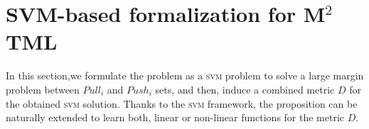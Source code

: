 \section{SVM-based formalization for M$^2$TML}
\label{sec:svm_based}
In this section,we formulate the problem as a \textsc{svm} problem to solve a large margin problem between $Pull_i$ and $Push_i$ sets, and then, induce a combined metric $D$ for the obtained \textsc{svm} solution. 
Thanks to the \textsc{svm} framework, the proposition can be naturally extended to learn both, linear or non-linear functions for the metric $D$.

